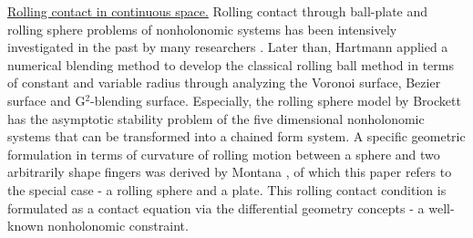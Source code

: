 \noindent\uline{Rolling contact in continuous space.} 
Rolling contact through ball-plate and rolling sphere problems of nonholonomic systems has been intensively investigated in the past by many researchers \cite{Robert00_BallRolling_OnSphere, Borisov08_ChaplypinBall_FixSphere, Borisov08_Dynamics_NonHolonomic, Borisov08_ExplicitIntegration_NonHolonomic}. Later than, Hartmann \cite{Hartmann00_Blending_ContactCurves} applied a numerical blending method to develop the classical rolling ball method in terms of constant and variable radius through analyzing the Voronoi surface, Bezier surface and G$^2$-blending surface. Especially, the rolling sphere model by Brockett \cite{Brockett93_NonholonomicKinematic} has the asymptotic stability problem of the five dimensional nonholonomic systems that can be transformed into a chained form system. A specific  geometric formulation in terms of curvature of rolling motion between a sphere and two arbitrarily shape fingers was derived by Montana \cite{Montana88_Kinematics_Contact_Grasp}, of which this paper refers to the special case - a rolling sphere and a plate. This rolling contact condition is formulated as a contact equation via the differential geometry concepts - a well-known nonholonomic constraint.\\


